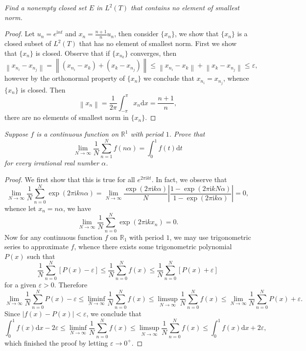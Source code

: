 \begin{problem}\em
Find a nonempty closed set $E$ in $L^2(T)$ that contains no element of smallest norm.
\end{problem}
\begin{proof}
Let $u_n=e^{\mathrm{i}nt}$ and $x_n=\frac{n+1}{n}u_n$, then consider $\{x_n\}$, we show that $\{x_n\}$ is a closed subset of $L^2(T)$ that has no element of smallest norm. First we show that $\{x_n\}$ is closed. Observe that if $\{x_{n_k}\}$ converges, then 
$$
\left\| x_{n_i}-x_{n_j} \right\| =\left\| \left( x_{n_i}-x_k \right) +\left( x_k-x_{n_j} \right) \right\| \le \left\| x_{n_i}-x_k \right\| +\left\| x_k-x_{n_j} \right\| \le \varepsilon ,
$$
however by the orthonormal property of $\{x_n\}$ we conclude that $x_{n_i}=x_{n_j}$, whence $\{x_n\}$ is closed. Then 
$$
\left\| x_n \right\| =\frac{1}{2\pi}\int_{-\pi}^{\pi}{x_n\mathrm{d}x}=\frac{n+1}{n},
$$
there are no elements of smallest norm in $\{x_n\}$.
\end{proof}
\begin{problem}\em
Suppose $f$ is a continuous function on $\mathbb{R}^1$ with period $1$. Prove that 
$$
\lim_{N\rightarrow \infty} \frac{1}{N}\sum_{n=1}^N{f\left( n\alpha \right)}=\int_0^1{f\left( t \right) \mathrm{d}t}
$$
for every irrational real number $\alpha$.
\end{problem}
\begin{proof}
We first show that this is true for all $e^{2\pi\mathrm{i}kt}$. In fact, we observe that 
$$
\lim_{N\rightarrow \infty} \frac{1}{N}\sum_{n=0}^N{\exp \left( 2\pi \mathrm{i}kn\alpha \right)}=\lim_{N\rightarrow \infty} \frac{\exp \left( 2\pi \mathrm{i}k\alpha \right)}{N}\left| \frac{1-\exp \left( 2\pi \mathrm{i}kN\alpha \right)}{1-\exp \left( 2\pi \mathrm{i}k\alpha \right)} \right|=0,
$$
whence let $x_n=n\alpha$, we have 
$$
\lim_{N\rightarrow \infty} \frac{1}{N}\sum_{n=0}^N{\exp \left( 2\pi \mathrm{i}kx_n \right)}=0.
$$
Now for any continuous function $f$ on $\mathbb{R}_1$ with period $1$, we may use trigonometric series to approximate $f$, whence there exists some trigonometric polynomial $P(x)$ such that 
$$
\frac{1}{N}\sum_{n=0}^N{\left[ P\left( x \right) -\varepsilon \right]}\le \frac{1}{N}\sum_{n=0}^N{f\left( x \right)}\le \frac{1}{N}\sum_{n=0}^N{\left[ P\left( x \right) +\varepsilon \right]}
$$
for a given $\varepsilon>0$. Therefore 
$$
\lim_{N\rightarrow \infty} \frac{1}{N}\sum_{n=0}^N{P\left( x \right)}-\varepsilon \le \mathop {\lim\mathrm{inf}} \limits_{N\rightarrow \infty}\frac{1}{N}\sum_{n=0}^N{f\left( x \right)}\le \mathop {\lim\mathrm{sup}} \limits_{N\rightarrow \infty}\frac{1}{N}\sum_{n=0}^N{f\left( x \right)}\le \lim_{N\rightarrow \infty} \frac{1}{N}\sum_{n=0}^N{P\left( x \right)}+\varepsilon .
$$
Since $|f(x)-P(x)|<\varepsilon$, we conclude that 
$$
\int_0^1{f\left( x \right) \mathrm{d}x}-2\varepsilon \le \mathop {\lim\mathrm{inf}} \limits_{N\rightarrow \infty}\frac{1}{N}\sum_{n=0}^N{f\left( x \right)}\le \mathop {\lim\mathrm{sup}} \limits_{N\rightarrow \infty}\frac{1}{N}\sum_{n=0}^N{f\left( x \right)}\le \int_0^1{f\left( x \right) \mathrm{d}x}+2\varepsilon ,
$$
which finished the proof by letting $\varepsilon\to 0^+$.
\end{proof}
